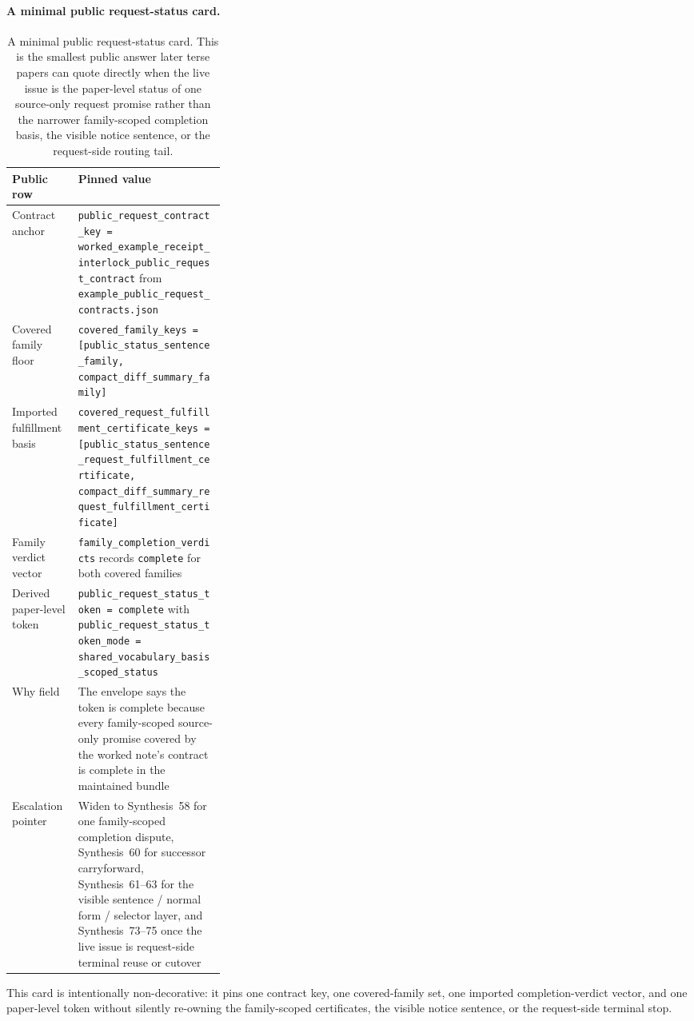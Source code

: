 \documentclass[11pt]{article}
\begin{document}
\paragraph{A minimal public request-status card.}
\begin{table}[t]
\centering
\small
\begin{tabularx}{0.97\linewidth}{@{}p{0.31\linewidth}X@{}}
\toprule
\textbf{Public row} & \textbf{Pinned value}\\
\midrule
Contract anchor & \texttt{public\_request\_contract\_key = worked\_example\_receipt\_interlock\_public\_request\_contract} from \nolinkurl{example_public_request_contracts.json} \\
Covered family floor & \texttt{covered\_family\_keys = [public\_status\_sentence\_family, compact\_diff\_summary\_family]} \\
Imported fulfillment basis & \texttt{covered\_request\_fulfillment\_certificate\_keys = [public\_status\_sentence\_request\_fulfillment\_certificate, compact\_diff\_summary\_request\_fulfillment\_certificate]} \\
Family verdict vector & \texttt{family\_completion\_verdicts} records \texttt{complete} for both covered families \\
Derived paper-level token & \texttt{public\_request\_status\_token = complete} with \texttt{public\_request\_status\_token\_mode = shared\_vocabulary\_basis\_scoped\_status} \\
Why field & The envelope says the token is complete because every family-scoped source-only promise covered by the worked note's contract is complete in the maintained bundle \\
Escalation pointer & Widen to Synthesis~58 for one family-scoped completion dispute, Synthesis~60 for successor carryforward, Synthesis~61--63 for the visible sentence / normal form / selector layer, and Synthesis~73--75 once the live issue is request-side terminal reuse or cutover \\
\bottomrule
\end{tabularx}
\caption{A minimal public request-status card. This is the smallest public answer later terse papers can quote directly when the live issue is the paper-level status of one source-only request promise rather than the narrower family-scoped completion basis, the visible notice sentence, or the request-side routing tail.}
\label{tab:minimal-public-request-status-card}
\end{table}

This card is intentionally non-decorative: it pins one contract key, one covered-family set, one imported completion-verdict vector, and one paper-level token without silently re-owning the family-scoped certificates, the visible notice sentence, or the request-side terminal stop.\cite{series:workedexample}
\end{document}

